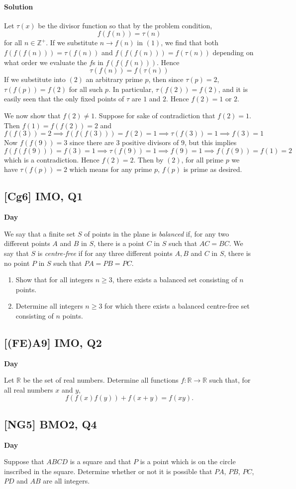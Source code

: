 \documentclass[10pt]{article}
\newcommand{\themonth}{March}
\newcommand{\theyear}{2019}
\newcounter{day}
\newcounter{solution}
\newcounter{datenumber}
\newcommand{\problem}[4][0]{
	\newpage
	\subsection{[#3] \space #2} \hfill 
	{\large\textbf{Day \arabic{day}}} %
	\begin{flushleft} #4 \end{flushleft}
	\vspace{1em}
	\addtocounter{day}{1}
	\addtocounter{datenumber}{1}
	\setcounter{solution}{1}
}
\newcommand{\anonsolution}[2][0]{
	\paragraph{Solution \arabic{solution}} 
	\begin{flushleft} #2 \end{flushleft}
	\addtocounter{solution}{1}
	\vspace{1em}
}
\begin{document}
\anonsolution[9]{Let \(\tau(x)\) be the divisor function so that by the problem condition, \[f(f(n))=\tau(n) \tag{1}\] for all \(n\in\mathbb{Z^+}\). If we substitute \(n\to f(n)\) in \((1)\), we find that both \(f(f(f(n)))=\tau(f(n))\) and \(f(f(f(n)))=f(\tau(n))\) depending on what order we evaluate the \(f\)s in \(f(f(f(n)))\). Hence \[\tau(f(n))=f(\tau(n))\tag{2}\] If we substitute into \((2)\) an arbitrary prime \(p\), then since \(\tau(p)=2\), \(\tau(f(p))=f(2)\) for all such \(p\).  In particular, \(\tau(f(2))=f(2)\), and it is easily seen that the only fixed points of \(\tau\) are \(1\) and \(2\). Hence \(f(2)=1\) or \(2\). 


We now show that \(f(2)\neq 1\). Suppose for sake of contradiction that \(f(2)=1\). Then \(f(1)=f(f(2))=2\) and \[f(f(3))=2 \implies f(f(f(3)))=f(2)=1 \implies \tau(f(3))=1 \implies f(3)=1\] Now \(f(f(9))=3\) since there are \(3\) positive divisors of \(9\), but this implies \[f(f(f(9)))=f(3)=1 \implies  \tau(f(9))=1 \implies f(9)=1 \implies f(f(9))=f(1)=2\] which is a contradiction. Hence \(f(2)=2\). Then by \((2)\), for all prime \(p\) we have \(\tau(f(p))=2\) which means for any prime \(p\), \(f(p)\) is prime as desired.} 

\problem[10]{2015 IMO, Q1}{Cg6}{We say that a finite set $S$ of points in the plane is \textit{balanced} if, for any two different points $A$ and $B$ in $S$, there is a point $C$ in $S$ such that $AC = BC$. We say that $S$ is \emph{centre-free} if for any three different points $A, B$ and $C$ in $S$, there is no point $P$ in $S$ such that $PA = PB = PC$. \begin{enumerate} \item Show that for all integers $n \geq 3$, there exists a balanced set consisting of $n$ points.\item Determine all integers $n \geq 3$ for which there exists a balanced centre-free set consisting of $n$ points.\end{enumerate}}

\problem[11]{2015 IMO, Q2}{(FE)A9}{Let $\mathbb{R}$ be the set of real numbers. Determine all functions $f : \mathbb{R} \to \mathbb{R}$ such that, for all real numbers $x$ and $y$, \[f(f(x)f(y)) + f(x + y) = f(xy).\]}

\problem[12]{2013 BMO2, Q4}{NG5}{Suppose that $ABCD$ is a square and that $P$ is a point which is on the circle inscribed in the square. Determine whether or not it is possible that $PA$, $PB$, $PC$, $PD$ and $AB$ are all integers.}
\end{document}
